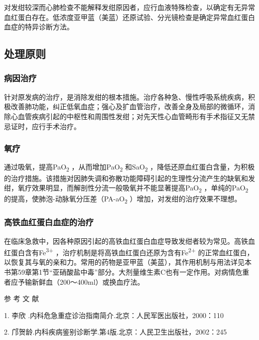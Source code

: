 对发绀较深而心肺检查不能解释发绀原因者，应行血液特殊检查，以确定有无异常血红蛋白存在。低浓度亚甲蓝（美蓝）还原试验、分光镜检查是确定异常血红蛋白血症的特异诊断方法。

\subsection{处理原则}

\subsubsection{病因治疗}

针对原发病的治疗，是消除发绀的根本措施。治疗各种急、慢性呼吸系统疾病，积极改善肺功能，纠正低氧血症；强心及扩血管治疗，改善全身及局部的微循环，消除心血管疾病引起的中枢性和周围性发绀；对先天性心血管畸形有手术指征又无禁忌证时，应行手术治疗。

\subsubsection{氧疗}

通过吸氧，提高PaO\textsubscript{2} ，从而增加PaO\textsubscript{2}
和SaO\textsubscript{2}
，降低还原血红蛋白含量，为积极的治疗措施。该措施对因肺失调和弥散功能障碍引起的生理性分流产生的缺氧和发绀，氧疗效果明显，而解剖性分流一般吸氧并不能显著提高PaO\textsubscript{2}
，单纯的PaO\textsubscript{2}
的提高，使肺泡-动脉氧分压差（PA-aO\textsubscript{2}
）增加，对发绀的治疗效果不理想。

\subsubsection{高铁血红蛋白血症的治疗}

在临床急救中，因各种原因引起的高铁血红蛋白血症导致发绀者较为常见。高铁血红蛋白含有Fe\textsuperscript{3+}
，治疗机制是将高铁血红蛋白还原为含有Fe\textsuperscript{2+}
的正常血红蛋白，以恢复其与氧的亲和力。常用的药物是亚甲蓝（美蓝），其作用机制与用法详见本书第59章第1节“亚硝酸盐中毒”部分。大剂量维生素C也有一定作用。对病情危重者应予输新鲜血（200～400ml）或换血疗法。


\hypertarget{text00042.htmlux5cux23CHP1-17-4}{}
参 考 文 献

1. 李欣 .内科危急重症诊治指南简介.北京：人民军医出版社，2000：110

2. 邝贺龄.内科疾病鉴别诊断学.第4版.北京：人民卫生出版社，2002：245

\protect\hypertarget{text00043.html}{}{}

